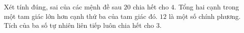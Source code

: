 \begin{ex}
Xét tính đúng, sai của các mệnh đề sau
\choiceTF
{\True $20$ chia hết cho $4$.}
{\True Tổng hai cạnh trong một tam giác lớn hơn cạnh thứ ba của tam giác đó.}
{$12$ là một số chính phương.}
{\True Tích của ba số tự nhiên liên tiếp luôn chia hết cho $3$.}
\end{ex}
